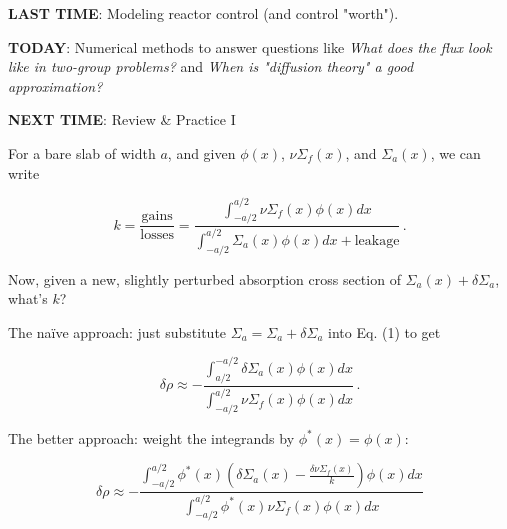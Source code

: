 \documentclass[compact]{ne630handout}
\begin{document}
\begin{handoutflow}


\textbf{LAST TIME}: Modeling reactor control (and control "worth").


\textbf{TODAY}:  Numerical methods to answer questions like \emph{What does the flux look like in two-group problems?} and \emph{When is "diffusion theory" a good approximation?}


\textbf{NEXT TIME}: Review \& Practice I



For a bare slab of width $a$, and given $\phi(x)$, $\nu\Sigma_f(x)$, and $\Sigma_a(x)$, we can write


\begin{equation*}
k = \frac{\text{gains}}{\text{losses}} =
  \frac{\displaystyle \int^{a/2}_{-a/2} \nu\Sigma_f(x) \phi(x) dx}
       {\displaystyle\int^{a/2}_{-a/2} \Sigma_a(x) \phi(x) dx + \text{leakage}} \, .
\tag{1}
\end{equation*}

Now, given a new, slightly perturbed absorption cross section of $\Sigma_a(x) + \delta \Sigma_a$, what's $k$?


The naïve approach: just substitute $\Sigma_a = \Sigma_a + \delta \Sigma_a$ into Eq. (1) to get


\begin{equation*}
\delta \rho  \approx
- \frac{ \displaystyle \int_{a/2}^{-a/2}
   \delta\Sigma_a(x) \phi(x) dx}
   { \displaystyle \int_{-a/2}^{a/2}  \nu\Sigma_f(x) \phi(x) dx}\, .
   \tag{2}
\end{equation*}

The better approach: weight the integrands by $\phi^*(x)=\phi(x)$:


\begin{equation*}
\delta \rho \approx - \frac{ \displaystyle \int_{-a/2}^{a/2} \phi^*(x)
   \left(\delta\Sigma_a(x)- \frac{\delta \nu\Sigma_f(x)}{k} \right) \phi(x) dx}
   { \displaystyle \int_{-a/2}^{a/2} \phi^*(x) \nu\Sigma_f(x) \phi(x) dx}
\tag{3}
\end{equation*}


\end{handoutflow}
\end{document}
